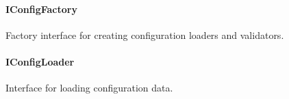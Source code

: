 \hypertarget{iconfigfactory-1}{%
\paragraph{IConfigFactory}\label{iconfigfactory-1}}

Factory interface for creating configuration loaders and validators.

\begin{Shaded}
\begin{Highlighting}[]
  \OperatorTok{\textless{}}\OperatorTok{\textgreater{}}\OperatorTok{:}\NormalTok{ \{}
\OperatorTok{:} \OperatorTok{;}
\OperatorTok{:} \OperatorTok{;}
\OperatorTok{:}\OperatorTok{;}
\NormalTok{  \})}\OperatorTok{:}\OperatorTok{\textless{}}\OperatorTok{\textgreater{};}
  
  \OperatorTok{\textless{}}\OperatorTok{\textgreater{}}\OperatorTok{:}\OperatorTok{:}\OperatorTok{\textless{}}\OperatorTok{\textgreater{};}
\NormalTok{\}}
\end{Highlighting}
\end{Shaded}

\hypertarget{iconfigloader-1}{%
\paragraph{IConfigLoader}\label{iconfigloader-1}}

Interface for loading configuration data.

\begin{Shaded}
\begin{Highlighting}[]
\OperatorTok{\textless{}}\OperatorTok{\textgreater{}}\NormalTok{ \{}
  \NormalTok{()}\OperatorTok{:} \OperatorTok{\textless{}}\OperatorTok{\textgreater{};}
\OperatorTok{:}\OperatorTok{:}\OperatorTok{\textless{}}\OperatorTok{\textgreater{}}\NormalTok{) }\KeywordTok{=\textgreater{}} \NormalTok{)}\OperatorTok{:} \OperatorTok{;}
\NormalTok{()}\OperatorTok{:} \OperatorTok{;}
\NormalTok{\}}
\end{Highlighting}
\end{Shaded}

